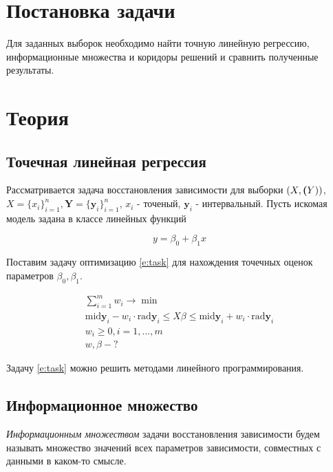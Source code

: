 \documentclass[a4paper,12pt]{article}
\begin{document}
    
    \newpage

    \tableofcontents
    \listoffigures
    \newpage

    \section{Постановка задачи}
    Для заданных выборок необходимо найти точную линейную регрессию, информационные множества и коридоры решений и сравнить полученные результаты.
    \section{Теория}
    \subsection{Точечная линейная регрессия}
    \quad Рассматривается задача восстановления зависимости для выборки
    $ (X, \textbf(Y))$, $ X = \{x_i\}_{i=1}^{n}, \textbf{Y} = \{\textbf{y}_i\}_{i=1}^{n} $,
    $ x_i $ - точеный, $ \textbf{y}_i $ - интервальный.
    Пусть искомая модель задана в классе линейных функций

    \begin{equation}
        y = \beta_0 + \beta_1 x
        \label{e:model}
    \end{equation}

    Поставим задачу оптимизацию \ref{e:task} для нахождения точечных оценок
    параметров $ \beta_0, \beta_1 $.

    \begin{equation}
        \begin{gathered}
            \sum_{i = 1}^{m}w_{i} \to \min \\
            \text{mid}\textbf{y}_{i} - w_{i} \cdot \text{rad}\textbf{y}_{i} \leq X\beta \leq \text{mid}\textbf{y}_{i} + w_{i} \cdot \text{rad}\textbf{y}_{i} \\
            w_{i} \geq 0, i = 1, ..., m \\
            w, \beta - ?
        \end{gathered}
        \label{e:task}
    \end{equation}

    Задачу \ref{e:task} можно решить методами линейного программирования.

    \subsection{Информационное множество}
    \quad \textsl{Информационным множеством} задачи восстановления зависимости
    будем называть множество значений всех параметров зависимости,
    совместных с данными в каком-то смысле.
\end{document}
